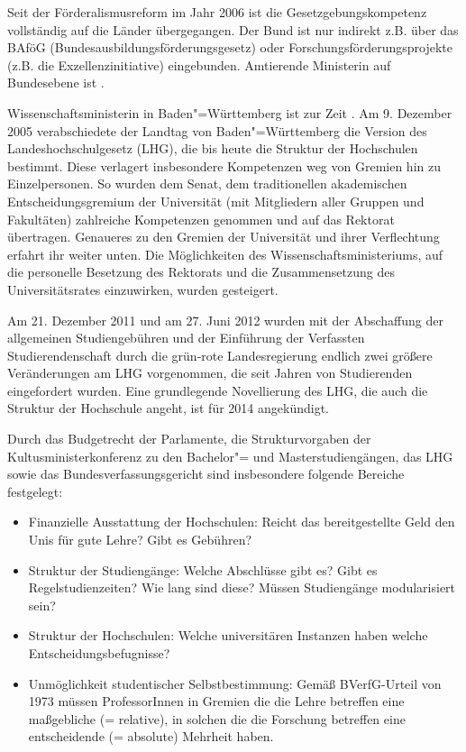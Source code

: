 Seit der Förderalismusreform im Jahr 2006 ist die Gesetzgebungskompetenz vollständig auf die Länder übergegangen. Der Bund ist nur indirekt z.B. über das BAföG (Bundesausbildungsförderungsgesetz) oder Forschungsförderungsprojekte (z.B. die Exzellenzinitiative) eingebunden. Amtierende Ministerin auf Bundesebene ist \wissenschaftsministerbund .

Wissenschaftsministerin in Baden"=Württemberg ist zur Zeit \wissenschaftsministerbawue .
Am 9. Dezember 2005 verabschiedete der Landtag von Baden"=Württemberg die Version des Landeshochschulgesetz (LHG), die bis heute die Struktur der Hochschulen bestimmt. Diese verlagert insbesondere Kompetenzen weg von Gremien hin zu Einzelpersonen. So wurden dem Senat, dem traditionellen akademischen Entscheidungsgremium der Universität (mit Mitgliedern aller Gruppen und Fakultäten) zahlreiche Kompetenzen genommen und auf das Rektorat übertragen. Genaueres zu den Gremien der Universität und ihrer Verflechtung erfahrt ihr weiter unten. Die Möglichkeiten des Wissenschaftsministeriums, auf die personelle Besetzung des Rektorats und die Zusammensetzung des Universitätsrates einzuwirken, wurden gesteigert.

Am 21. Dezember 2011 und am 27. Juni 2012 wurden mit der Abschaffung der allgemeinen Studiengebühren und der Einführung der Verfassten Studierendenschaft durch die grün-rote Landesregierung endlich zwei größere Veränderungen am LHG vorgenommen, die seit Jahren von Studierenden eingefordert wurden. Eine grundlegende Novellierung des LHG, die auch die Struktur der Hochschule angeht, ist für 2014 angekündigt.

Durch das Budgetrecht der Parlamente, die Strukturvorgaben der Kultusministerkonferenz zu den Bachelor"= und Masterstudiengängen, das LHG sowie das Bundesverfassungsgericht sind insbesondere folgende Bereiche festgelegt:
\begin{itemize}
\item Finanzielle Ausstattung der Hochschulen: Reicht das bereitgestellte Geld den Unis für gute Lehre? Gibt es Gebühren?
\item Struktur der Studiengänge: Welche Abschlüsse gibt es? Gibt es Regelstudienzeiten? Wie lang sind diese? Müssen Studiengänge modularisiert sein?
\item Struktur der Hochschulen: Welche universitären Instanzen haben welche Entscheidungsbefugnisse?
\item Unmöglichkeit studentischer Selbstbestimmung: Gemäß BVerfG-Urteil von 1973 müssen ProfessorInnen in Gremien die die Lehre betreffen eine maßgebliche (= relative), in solchen die die Forschung betreffen eine entscheidende (= absolute) Mehrheit haben.
\end{itemize}


